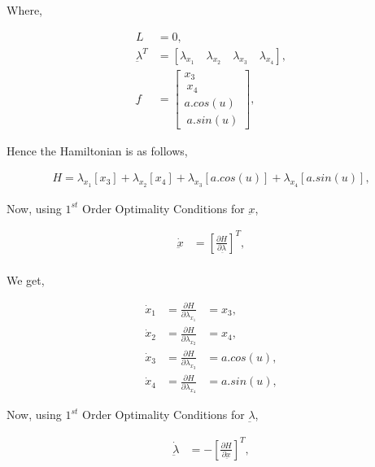 \documentclass[11pt,usenames]{article}
\begin{document}
	Where,
	
	\begin{align}
	L &= 0, \nonumber \\
	\underbar \lambda^{T} &= \left[  \lambda_{x_{1}} \quad \lambda_{x_{2}} \quad \lambda_{x_{3}} \quad \lambda_{x_{4}}  \right],  \\
	\underbar f &=
	\begin{bmatrix}
	x_{3} \\ \ x_{4} \\  a.cos(u) \\ \ a.sin(u) 
	\end{bmatrix}, \nonumber 
	\end{align}
	
	
	\newpage
	
	
	Hence the Hamiltonian is as follows,
	
	\begin{align}
	H = \lambda_{x_{1}} \left[  x_{3} \right] + \lambda_{x_{2}} \left[  x_{4} \right] + \lambda_{x_{3}} \left[  a.cos(u) \right] + \lambda_{x_{4}} \left[  a.sin(u) \right] ,
	\end{align}
	
	Now, using $ 1^{st} $ Order Optimality Conditions for $ \underbar x $, 
	
	\begin{align}
	\dot{\underbar x} &= \left[ \frac{\partial H}{\partial{\underbar \lambda}}  \right]^{T}  ,\\
	\end{align}
	
	We get,
	
	\begin{align}
	\dot x_{1} &= \frac{\partial H}{\partial \lambda_{x_{1}}}  &= x_{3}, \nonumber \\
	\dot x_{2} &= \frac{\partial H}{\partial \lambda_{x_{2}}}  &= x_{4},\\
	\dot x_{3} &= \frac{\partial H}{\partial \lambda_{x_{3}}}  &= a.cos(u),\nonumber\\
	\dot x_{4} &= \frac{\partial H}{\partial \lambda_{x_{4}}}  &= a.sin(u), \nonumber
	\end{align}
	
	Now, using $ 1^{st} $ Order Optimality Conditions for $  \underbar\lambda $, 
	
	\begin{align}
	\dot{\underbar \lambda} &= - \left[ \frac{\partial H}{\partial{\underbar x}}  \right]^{T}  ,
	\end{align}
	
\end{document}
